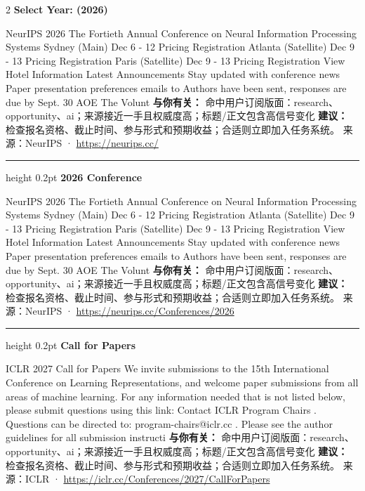 \documentclass[10.5pt]{ctexart}
\begin{document}
\begin{multicols}{2}
{\large\bfseries Select Year: (2026)}\par
NeurIPS 2026 The Fortieth Annual Conference on Neural Information Processing Systems Sydney (Main) Dec 6 - 12 Pricing Registration Atlanta (Satellite) Dec 9 - 13 Pricing Registration Paris (Satellite) Dec 9 - 13 Pricing Registration View Hotel Information Latest Announcements Stay updated with conference news Paper presentation preferences emails to Authors have been sent, responses are due by Sept. 30 AOE The Volunt
\textbf{与你有关：} 命中用户订阅版面：research、opportunity、ai；来源接近一手且权威度高；标题/正文包含高信号变化
\textbf{建议：} 检查报名资格、截止时间、参与形式和预期收益；合适则立即加入任务系统。
{\footnotesize\color{ormuted} 来源：NeurIPS · \url{https://neurips.cc/}}
\vspace{2mm}
\hrule height 0.2pt
\vspace{2mm}
{\large\bfseries 2026 Conference}\par
NeurIPS 2026 The Fortieth Annual Conference on Neural Information Processing Systems Sydney (Main) Dec 6 - 12 Pricing Registration Atlanta (Satellite) Dec 9 - 13 Pricing Registration Paris (Satellite) Dec 9 - 13 Pricing Registration View Hotel Information Latest Announcements Stay updated with conference news Paper presentation preferences emails to Authors have been sent, responses are due by Sept. 30 AOE The Volunt
\textbf{与你有关：} 命中用户订阅版面：research、opportunity、ai；来源接近一手且权威度高；标题/正文包含高信号变化
\textbf{建议：} 检查报名资格、截止时间、参与形式和预期收益；合适则立即加入任务系统。
{\footnotesize\color{ormuted} 来源：NeurIPS · \url{https://neurips.cc/Conferences/2026}}
\vspace{2mm}
\hrule height 0.2pt
\vspace{2mm}
{\large\bfseries Call for Papers}\par
ICLR 2027 Call for Papers We invite submissions to the 15th International Conference on Learning Representations, and welcome paper submissions from all areas of machine learning. For any information needed that is not listed below, please submit questions using this link: Contact ICLR Program Chairs . Questions can be directed to: program-chairs@iclr.cc . Please see the author guidelines for all submission instructi
\textbf{与你有关：} 命中用户订阅版面：research、opportunity、ai；来源接近一手且权威度高；标题/正文包含高信号变化
\textbf{建议：} 检查报名资格、截止时间、参与形式和预期收益；合适则立即加入任务系统。
{\footnotesize\color{ormuted} 来源：ICLR · \url{https://iclr.cc/Conferences/2027/CallForPapers}}

\end{multicols}
\end{document}
